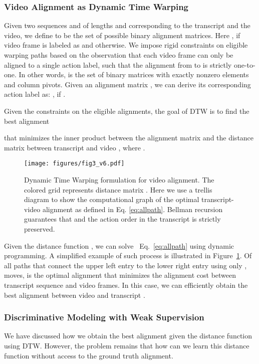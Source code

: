 \documentclass[10pt,twocolumn,letterpaper]{article}
\newcommand{\eqnref}[1]{{Eq.\ \eqref{eq:#1}}}
\begin{document}
\subsubsection{Video Alignment as Dynamic Time Warping}
\label{sec:vid_align}

Given two sequences  and  of lengths  and  corresponding to the transcript and the video, we define  to be the set of possible binary alignment matrices. Here ,  if video frame  is labeled as  and  otherwise. We impose rigid constraints on eligible warping paths based on the observation that each video frame can only be aligned to a single action label, such that the alignment from  to  is strictly one-to-one. In other words,  is the set of binary matrices with exactly  nonzero elements and column pivots. Given an alignment matrix , we can derive its corresponding action label  as: , if .


Given the constraints on the eligible alignments, the goal of DTW is to find the best alignment  

that minimizes the inner product between the alignment matrix  and the distance matrix  between transcript  and video , where .

\begin{figure}[tb]
\centering
   \texttt{[image: figures/fig3\_v6.pdf]}
  \caption{
  Dynamic Time Warping formulation for video alignment.  The  colored grid represents distance matrix . Here we use a trellis diagram to show the computational graph of the optimal transcript-video alignment  as defined in Eq. \eqref{eq:allpath}. Bellman recursion guarantees that  and the action order in the transcript is strictly preserved.
  }
   \vspace{-1mm}
\label{fig:fig3}
\end{figure}

Given the distance function , we can solve ~\eqnref{allpath} using dynamic programming. A simplified example of such process is illustrated in Figure~\ref{fig:fig3}. Of all paths that connect the upper left entry  to the lower right entry  using only ,  moves,  is the optimal alignment that minimizes the alignment cost between transcript sequence and video frames. In this case, we can efficiently obtain the best alignment between video  and transcript .


\subsubsection{Discriminative Modeling with Weak Supervision}
We have discussed how we obtain the best alignment  given the distance function  using DTW. However, 
the problem remains that how can we learn this distance function without access to the ground truth alignment.
\end{document}
